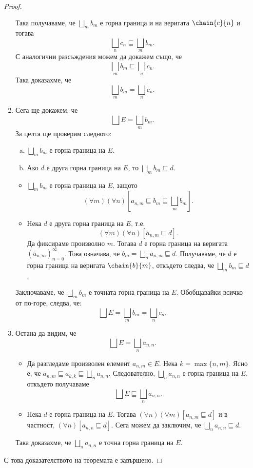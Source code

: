 \begin{proof}
\begin{enumerate}[1)]
    Така получаваме, че $\bigsqcup_m b_m$ е горна граница и на веригата $\chain{c}{n}$
    и тогава \[\bigsqcup_n c_n \sqsubseteq \bigsqcup_m b_m.\]
    С аналогични разсъждения можем да докажем също, че 
    \[\bigsqcup_m b_m \sqsubseteq \bigsqcup_n c_n.\]
    Така доказахме, че \[\bigsqcup_m b_m = \bigsqcup_n c_n.\]
  \item
    Сега ще докажем, че \[\bigsqcup E = \bigsqcup_m b_m.\]
    За целта ще проверим следното:
    \begin{enumerate}[a)]
    \item 
      $\bigsqcup_m b_m$ е горна граница на $E$.
    \item
      Ако $d$ е друга горна граница на $E$, то $\bigsqcup_m b_m \sqsubseteq d$.
    \end{enumerate}
    \begin{itemize}
    \item 
      $\bigsqcup_m b_m$ е горна граница на $E$, защото
      \[(\forall m)(\forall n)[a_{n,m} \sqsubseteq b_m \sqsubseteq \bigsqcup_m b_m].\]
    \item
      Нека $d$ е друга горна граница на $E$, т.е.
      \[(\forall m)(\forall n)[a_{n,m} \sqsubseteq d].\]
      Да фиксираме произволно $m$.
      Тогава $d$ е горна граница на веригата $(a_{n,m})^\infty_{n=0}$.
      Това означава, че $b_m = \bigsqcup_n a_{n,m} \sqsubseteq d$.
      Получаваме, че $d$ е горна граница на веригата $\chain{b}{m}$,
      откъдето следва, че $\bigsqcup_m b_m \sqsubseteq d$.
    \end{itemize}
    Заключаваме, че $\bigsqcup_m b_m$ е точната горна граница на $E$.
    Обобщавайки всичко от по-горе, следва, че:
    \[\bigsqcup E = \bigsqcup_m b_m = \bigsqcup_n c_n.\]
  \item
    Остана да видим, че 
    \[\bigsqcup E = \bigsqcup_n a_{n,n}.\]
    \begin{itemize}
    \item 
      Да разгледаме произволен елемент $a_{n,m} \in E$.
      Нека $k = \max\{n,m\}$.
      Ясно е, че $a_{n,m} \sqsubseteq a_{k,k} \sqsubseteq \bigsqcup_na_{n,n}$.
      Следователно, $\bigsqcup_n a_{n,n}$ е горна граница на $E$, откъдето получаваме
      \[\bigsqcup E \sqsubseteq \bigsqcup_n a_{n,n}.\]
    \item
      Нека $d$ е горна граница на $E$.
      Тогава $(\forall n)(\forall m)[a_{n,m} \sqsubseteq d]$
      и в частност, $(\forall n)[a_{n,n} \sqsubseteq d]$.
      Сега можем да заключим, че $\bigsqcup_n a_{n,n} \sqsubseteq d$.    
    \end{itemize}
    Така доказахме, че $\bigsqcup_n a_{n,n}$ е точна горна граница на $E$.
    \end{enumerate}
  С това доказателството на теоремата е завършено.
\end{proof}

